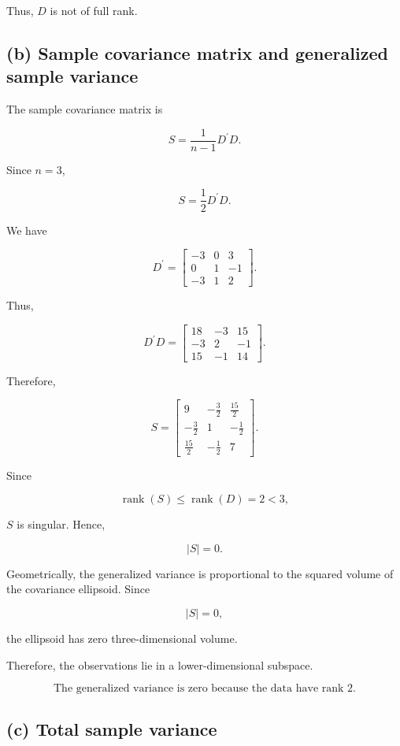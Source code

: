 \documentclass{article}
\begin{document}
Thus, \(D\) is not of full rank.

\subsection*{(b) Sample covariance matrix and generalized sample variance}

The sample covariance matrix is

\[
S=\frac{1}{n-1}D^\prime D.
\]

Since \(n=3\),

\[
S=\frac12D^\prime D.
\]

We have

\[
D^\prime
=
\begin{bmatrix}
-3&0&3\\
0&1&-1\\
-3&1&2
\end{bmatrix}.
\]

Thus,

\[
D^\prime D
=
\begin{bmatrix}
18&-3&15\\
-3&2&-1\\
15&-1&14
\end{bmatrix}.
\]

Therefore,

\[
\boxed{
S=
\begin{bmatrix}
9&-\frac32&\frac{15}{2}\\
-\frac32&1&-\frac12\\
\frac{15}{2}&-\frac12&7
\end{bmatrix}}.
\]

Since

\[
\operatorname{rank}(S)
\leq
\operatorname{rank}(D)
=
2<3,
\]

\(S\) is singular. Hence,

\[
\boxed{|S|=0}.
\]

Geometrically, the generalized variance is proportional to the squared volume of the covariance ellipsoid. Since

\[
|S|=0,
\]

the ellipsoid has zero three-dimensional volume.

Therefore, the observations lie in a lower-dimensional subspace.

\[
\boxed{\text{The generalized variance is zero because the data have rank }2.}
\]

\subsection*{(c) Total sample variance}
\end{document}
